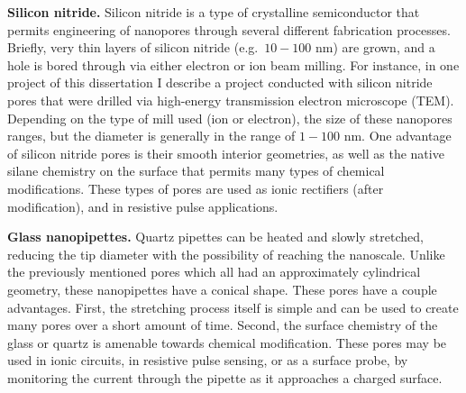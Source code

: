 			\textbf{Silicon nitride.} Silicon nitride is a type of crystalline semiconductor that permits engineering of nanopores through several different fabrication processes. Briefly, very thin layers of silicon nitride (e.g.~$10-100$ nm) are grown, and a hole is bored through via either electron or ion beam milling. For instance, in one project of this dissertation I describe a project conducted with silicon nitride pores that were drilled via high-energy transmission electron microscope (TEM). Depending on the type of mill used (ion or electron), the size of these nanopores ranges, but the diameter is generally in the range of $1-100$ nm. One advantage of silicon nitride pores is their smooth interior geometries, as well as the native silane chemistry on the surface that permits many types of chemical modifications. These types of pores are used as ionic rectifiers (after modification), and in resistive pulse applications.

			\textbf{Glass nanopipettes.} Quartz pipettes can be heated and slowly stretched, reducing the tip diameter with the possibility of reaching the nanoscale. Unlike the previously mentioned pores which all had an approximately cylindrical geometry, these nanopipettes have a conical shape. These pores have a couple advantages. First, the stretching process itself is simple and can be used to create many pores over a short amount of time. Second, the surface chemistry of the glass or quartz is amenable towards chemical modification. These pores may be used in ionic circuits, in resistive pulse sensing, or as a surface probe, by monitoring the current through the pipette as it approaches a charged surface.

